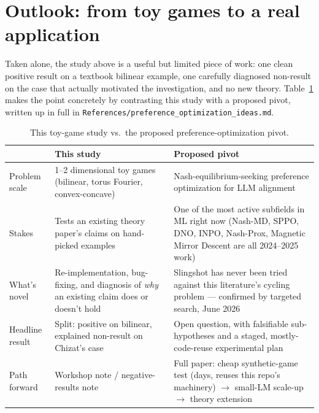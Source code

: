 \documentclass[11pt]{article}
\begin{document}
\clearpage
\section{Outlook: from toy games to a real application}
\label{sec:outlook}

Taken alone, the study above is a useful but limited piece of work: one
clean positive result on a textbook bilinear example, one carefully
diagnosed non-result on the case that actually motivated the investigation,
and no new theory. Table~\ref{tab:contrast} makes the point concretely by
contrasting this study with a proposed pivot, written up in full in
\texttt{References/preference\_optimization\_ideas.md}.

\begin{table}[H]
\centering
\caption{This toy-game study vs.\ the proposed preference-optimization pivot.}
\label{tab:contrast}
\begin{tabular}{@{}p{}p{}p{}@{}}
\toprule
 & \textbf{This study} & \textbf{Proposed pivot} \\
\midrule
Problem scale & 1--2 dimensional toy games (bilinear, torus Fourier, convex-concave) & Nash-equilibrium-seeking preference optimization for LLM alignment \\
\addlinespace
Stakes & Tests an existing theory paper's claims on hand-picked examples & One of the most active subfields in ML right now (Nash-MD, SPPO, DNO, INPO, Nash-Prox, Magnetic Mirror Descent are all 2024--2025 work) \\
\addlinespace
What's novel & Re-implementation, bug-fixing, and diagnosis of \emph{why} an existing claim does or doesn't hold & Slingshot has never been tried against this literature's cycling problem --- confirmed by targeted search, June 2026 \\
\addlinespace
Headline result & Split: positive on bilinear, explained non-result on Chizat's case & Open question, with falsifiable sub-hypotheses and a staged, mostly-code-reuse experimental plan \\
\addlinespace
Path forward & Workshop note / negative-results note & Full paper: cheap synthetic-game test (days, reuses this repo's machinery) $\to$ small-LM scale-up $\to$ theory extension \\
\bottomrule
\end{tabular}
\end{table}
\end{document}
